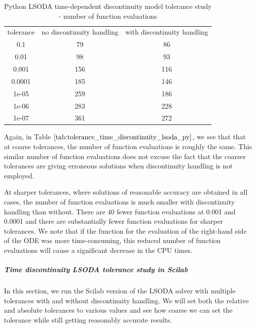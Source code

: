 \begin{table}[H]
\caption {Python LSODA time-dependent discontinuity model tolerance study - number of function evaluations} \label{tab:tolerance_time_discontinuity_lsoda_py} 
\begin{center}
\begin{tabular}{ c c c }
tolerance & no discontinuity handling & with discontinuity handling \\ 
0.1 & 79 & 86 \\
0.01 & 98 & 93 \\
0.001 & 156 & 116 \\
0.0001 & 185 & 146 \\
1e-05 & 259 & 186 \\
1e-06 & 283 & 228 \\
1e-07 & 361 & 272 \\
\end{tabular}
\end{center}
\end{table}
Again, in Table $\ref{tab:tolerance_time_discontinuity_lsoda_py}$, we see that that at coarse tolerances, the number of function evaluations is roughly the same. This similar number of function evaluations does not excuse the fact that the coarser tolerances are giving erroneous solutions when discontinuity handling is not employed.

At sharper tolerances, where solutions of reasonable accuracy are obtained in all cases, the number of function evaluations is much smaller with discontinuity handling than without. There are 40 fewer function evaluations at 0.001 and 0.0001 and there are substantially fewer function evaluations for sharper tolerances. We note that if the function for the evaluation of the right-hand side of the ODE was more time-consuming, this reduced number of function evaluations will cause a significant decrease in the CPU times.

\subparagraph{Time discontinuity LSODA tolerance study in Scilab}
In this section, we run the Scilab version of the LSODA solver with multiple tolerances with and without discontinuity handling. We will set both the relative and absolute tolerances to various values and see how coarse we can set the tolerance while still getting reasonably accurate results.

